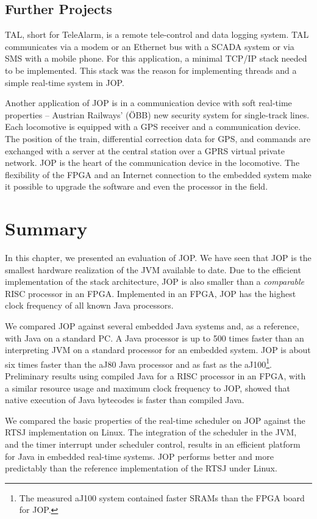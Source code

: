 \subsection{Further Projects}

TAL, short for TeleAlarm, is a remote tele-control and data logging
system. TAL communicates via a modem or an Ethernet bus with a SCADA
system or via SMS with a mobile phone. For this application, a
minimal TCP/IP stack needed to be implemented. This stack was the
reason for implementing threads and a simple real-time system in
JOP.

Another application of JOP is in a communication device with soft
real-time properties -- Austrian Railways' (\"OBB) new security
system for single-track lines. Each locomotive is equipped with a GPS
receiver and a communication device. The position of the train,
differential correction data for GPS, and commands are exchanged with
a server at the central station over a GPRS virtual private network.
JOP is the heart of the communication device in the locomotive. The
flexibility of the FPGA and an Internet connection to the embedded
system make it possible to upgrade the software and even the
processor in the field.


\section{Summary}

In this chapter, we presented an evaluation of JOP. We have seen
that JOP is the smallest hardware realization of the JVM available
to date. Due to the efficient implementation of the stack
architecture, JOP is also smaller than a \emph{comparable} RISC
processor in an FPGA. Implemented in an FPGA, JOP has the highest
clock frequency of all known Java processors.

We compared JOP against several embedded Java systems and, as a
reference, with Java on a standard PC. A Java processor is up to 500
times faster than an interpreting JVM on a standard processor for an
embedded system. JOP is about six times faster than the aJ80 Java
processor and as fast as the aJ100\footnote{The measured aJ100
system contained faster SRAMs than the FPGA board for JOP.}.
Preliminary results using compiled Java for a RISC processor in an
FPGA, with a similar resource usage and maximum clock frequency to
JOP, showed that native execution of Java bytecodes is faster than
compiled Java.

We compared the basic properties of the real-time scheduler on JOP
against the RTSJ implementation on Linux. The integration of the
scheduler in the JVM, and the timer interrupt under scheduler
control, results in an efficient platform for Java in embedded
real-time systems. JOP performs better and more predictably than the
reference implementation of the RTSJ under Linux.

